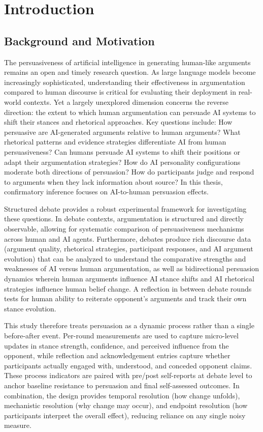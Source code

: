 \chapter{Introduction}

\section{Background and Motivation}

The persuasiveness of artificial intelligence in generating human-like arguments remains an
open and timely research question. As large language models become increasingly sophisticated,
understanding their effectiveness in argumentation compared to human discourse is critical for
evaluating their deployment in real-world contexts. Yet a largely unexplored dimension concerns
the reverse direction: the extent to which human argumentation can persuade AI systems to shift
their stances and rhetorical approaches. Key questions include: How persuasive are AI-generated
arguments relative to human arguments? What rhetorical patterns and evidence strategies differentiate
AI from human persuasiveness? Can humans persuade AI systems to shift their positions or adapt
their argumentation strategies? How do AI personality configurations moderate both directions of
persuasion? How do participants judge and respond to arguments when they lack information about source?
In this thesis, confirmatory inference focuses on AI-to-human persuasion effects.

Structured debate provides a robust experimental framework for investigating these questions.
In debate contexts, argumentation is structured and directly observable, allowing for
systematic comparison of persuasiveness mechanisms across human and AI agents.
Furthermore, debates produce rich discourse data (argument quality, rhetorical strategies,
participant responses, and AI argument evolution) that can be analyzed to understand the
comparative strengths and weaknesses of AI versus human argumentation, as well as bidirectional
persuasion dynamics wherein human arguments influence AI stance shifts and AI rhetorical strategies
influence human belief change.
A reflection in between debate rounds tests for human ability to reiterate opponent's arguments
and track their own stance evolution.

This study therefore treats persuasion as a dynamic process rather than a single before-after event.
Per-round measurements are used to capture
micro-level updates in stance strength, confidence, and perceived influence from the opponent,
while reflection and acknowledgement entries capture whether participants actually engaged with,
understood, and conceded opponent claims. These process indicators are paired with pre/post
self-reports at debate level to anchor baseline resistance to persuasion and final self-assessed
outcomes. In combination, the design provides temporal resolution (how change unfolds),
mechanistic resolution (why change may occur), and endpoint resolution (how participants interpret
the overall effect), reducing reliance on any single noisy measure.

